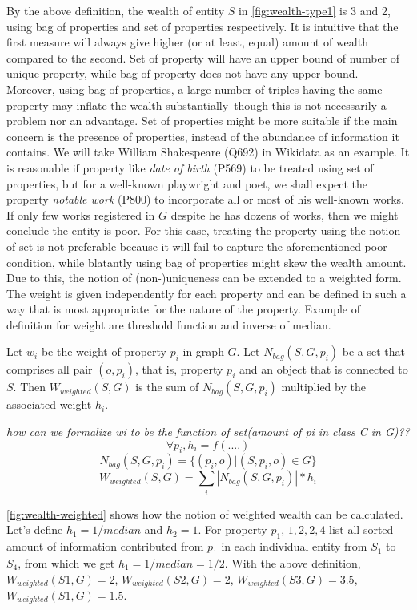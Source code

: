 \documentclass[
]{ceurart}
\begin{document}
By the above definition, the wealth of entity \(S\) in \autoref{fig:wealth-type1} is 3 and 2, using bag of properties and set of properties respectively.
It is intuitive that the first measure will always give higher (or at least, equal) amount of wealth compared to the second. Set of property will have an upper bound of number of unique property, while bag of property does not have any upper bound. Moreover, using bag of properties, a large number of triples having the same property may inflate the wealth substantially--though this is not necessarily a problem nor an advantage. Set of properties might be more suitable if the main concern is the presence of properties, instead of the abundance of information it contains. We will take William Shakespeare (Q692) in Wikidata as an example. It is reasonable if property like  \textit{date of birth} (P569) to be treated using set of properties, but for a well-known playwright and poet, we shall expect the property \textit{notable work} (P800) to incorporate all or most of his well-known works. If only few works registered in \(G\) despite he has dozens of works, then we might conclude the entity is poor. For this case, treating the property using the notion of set is not preferable because it will fail to capture the aforementioned poor condition, while blatantly using bag of properties might skew the wealth amount. Due to this, the notion of (non-)uniqueness can be extended to a weighted form. The weight is given independently for each property and can be defined in such a way that is most appropriate for the nature of the property. Example of definition for weight are threshold function and inverse of median.

Let \(w_i\) be the weight of property \(p_i\) in graph \(G\). Let \(N_{bag}(S,G,p_i)\) be a set that comprises all pair  \((o,p_i)\), that is, property \(p_i\) and an object that is connected to \(S\). Then \(W_{weighted}(S, G)\) is the sum of \(N_{bag}(S,G,p_i)\) multiplied by the associated weight \(h_i\).

\textit{how can we formalize wi to be the function of set(amount of pi in class C in G)??}
\[
    \forall p_i, h_i = f(....)
\]
\[
    N_{bag}(S,G,p_i) = \{(p_i, o) | (S, p_i, o) ∈ G\}
\]
\[
    W_{weighted}(S, G) = \sum_i |N_{bag}(S,G,p_i)| * h_i
\]

\autoref{fig:wealth-weighted} shows how the notion of weighted wealth can be calculated. Let's define \(h_1 = 1/median\) and \(h_2 = 1\). For property \(p_1\), \({1, 2, 2, 4}\) list all sorted amount of information contributed from \(p_1\) in each individual entity from \(S_1\) to \(S_4\), from which we get \(h_1 = 1/median = 1/2\). With the above definition, \(W_{weighted}(S1, G) = 2\), \(W_{weighted}(S2, G) = 2\), \(W_{weighted}(S3, G) = 3.5\), \(W_{weighted}(S1, G) = 1.5\).
\end{document}
